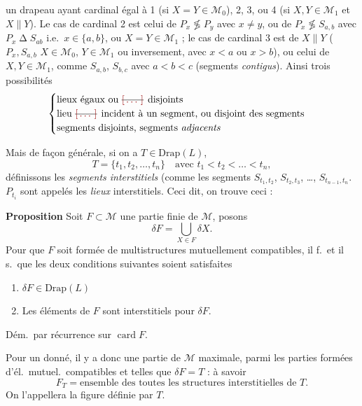 \documentclass[11pt,a4paper]{article}
\begin{document}
 un drapeau ayant cardinal égal à 1 (si $X = Y\in\mathcal{M}_0$), 2, 3, ou 4 (si $X,Y\in\mathcal{M}_1$ et $X\parallel Y$). Le cas de cardinal 2 est celui de $P_x\not\lessgtr P_y$ avec $x\neq y$, ou de $P_x\not\lessgtr S_{a,b}$ avec $P_x \mathrel{\Delta} S_{ab}$ i.e.\ $x\in\{a,b\}$, ou $X = Y \in \mathcal{M}_1$ ; le cas de cardinal 3 est  de $X\parallel Y$ ( $P_x, S_{a,b}$ $X\in\mathcal{M}_0$, $Y\in\mathcal{M}_1$ ou inversement, avec $x<a$ ou $x>b$), ou celui de $X,Y\in\mathcal{M}_1$, \uncertain{\ill{}} comme $S_{a,b}$, $S_{b,c}$ avec $a<b<c$ (segments \textit{contigus}). Ainsi trois possibilités
\[
\begin{cases}
\text{lieux égaux ou \struck{\ill{}} disjoints}\\
\text{lieu \struck{\ill{}} incident à un segment, ou disjoint des segments}\\
\text{segments disjoints, segments \textit{adjacents}}
\end{cases}
\]

Mais de façon générale, si on a $T\in\mathrm{Drap}(L)$,
\[
T = \{t_1,t_2,\ldots,t_n\} \quad \text{avec } t_1<t_2<\ldots<t_n ,
\]
définissons les \textit{segments interstitiels}  (comme les segments $S_{t_1,t_2}$, $S_{t_2,t_3}$, …, $S_{t_{n-1},t_n}$.    $P_{t_i}$ sont appelés les \textit{lieux} interstitiels. Ceci dit, on trouve ceci :


\textbf{Proposition} Soit $F\subset\mathcal{M}$ une partie finie  de $\mathcal{M}$, posons \struck{\ill{}}
\[
\delta F = \bigcup_{X\in F} \delta X .
\]
Pour que $F$ soit formée de multistructures mutuellement compatibles, il f.\ et il s.\ que les deux conditions suivantes soient satisfaites
\begin{enumerate}
\item[(i)] $\delta F \in \mathrm{Drap}(L)$ \struck{[NB $\delta F = \emptyset$ ssi $F = \emptyset$]}
\item[(ii)] Les éléments de $F$ sont interstitiels pour $\delta F$.
\end{enumerate}

Dém.\ par récurrence sur $\operatorname{card} F$. \struck{\ill{}}

Pour un \struck{\ill{}}  donné, il y a donc une partie  de $\mathcal{M}$ maximale, parmi les parties \struck{\ill{}} formées d'él.\ mutuel.\ compatibles et telles que $\delta F = T$ : à savoir
\[
F_T = \text{ensemble des toutes les structures interstitielles de } T .
\]
On l'appellera la figure  définie par $T$.
\end{document}
